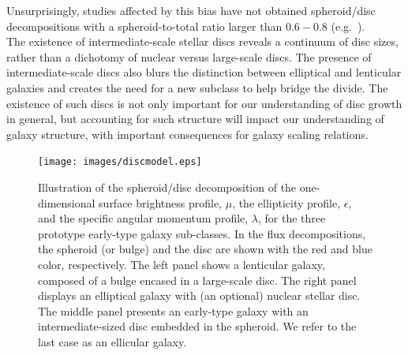 \documentclass[useAMS,usenatbib,article]{mn2e}
\begin{document}
Unsurprisingly, studies affected by this bias have not obtained spheroid/disc decompositions with a spheroid-to-total ratio larger than $0.6 - 0.8$ 
(e.g.~\citealt{gadotti2008,head2014,querejeta2015,mendezabreu2015}). \\
The existence of intermediate-scale stellar discs reveals a continuum of disc sizes, 
rather than a dichotomy of nuclear versus large-scale discs. 
The presence of intermediate-scale discs also blurs the distinction between elliptical and lenticular galaxies 
and creates the need for a new subclass to help bridge the divide. 
The existence of such discs is not only important for our understanding of disc growth in general, 
but accounting for such structure will impact our understanding of galaxy structure, 
with important consequences for galaxy scaling relations. 

\begin{figure}
\begin{center}
\texttt{[image: images/discmodel.eps]}
\caption{Illustration of the spheroid/disc decomposition of the one-dimensional surface brightness profile, $\mu$, 
the ellipticity profile, $\epsilon$, and the specific angular momentum profile, $\lambda$,
for the three prototype early-type galaxy sub-classes. 
In the flux decompositions, the spheroid (or bulge) and the disc are shown with the red and blue color, respectively. 
The left panel shows a lenticular galaxy, composed of a bulge encased in a large-scale disc. 
The right panel displays an elliptical galaxy with (an optional) nuclear stellar disc. 
The middle panel presents an early-type galaxy with an intermediate-sized disc embedded in the spheroid. 
We refer to the last case as an ellicular galaxy.}
\label{fig:model}
\end{center}
\end{figure}
\end{document}
